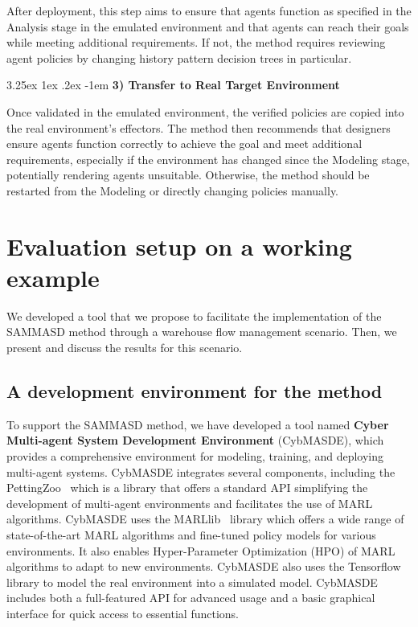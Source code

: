 \documentclass[conference]{IEEEtran}
\makeatletter
\renewcommand\paragraph{\@startsection{paragraph}{5}{\z@}%
  {3.25ex \@plus1ex \@minus.2ex}%
  {-1em}%
  {\normalfont\normalsize\bfseries}}
\makeatother
\begin{document}
After deployment, this step aims to ensure that agents function as specified in the Analysis stage in the emulated environment and that agents can reach their goals while meeting additional requirements. If not, the method requires reviewing agent policies by changing history pattern decision trees in particular.

\paragraph{\textbf{3) Transfer to Real Target Environment}}

Once validated in the emulated environment, the verified policies are copied into the real environment's effectors. The method then recommends that designers ensure agents function correctly to achieve the goal and meet additional requirements, especially if the environment has changed since the Modeling stage, potentially rendering agents unsuitable. Otherwise, the method should be restarted from the Modeling or directly changing policies manually.

\section{Evaluation setup on a working example}
\label{sec:evaluation}

We developed a tool that we propose to facilitate the implementation of the SAMMASD method through a warehouse flow management scenario. Then, we present and discuss the results for this scenario.

\subsection{A development environment for the method}

To support the SAMMASD method, we have developed a tool named \textbf{Cyber Multi-agent System Development Environment} (CybMASDE), which provides a comprehensive environment for modeling, training, and deploying multi-agent systems. CybMASDE integrates several components, including the PettingZoo~\cite{Terry2021} which is a library that offers a standard API simplifying the development of multi-agent environments and facilitates the use of MARL algorithms. CybMASDE uses the MARLlib~\cite{hu2022marllib} library which offers a wide range of state-of-the-art MARL algorithms and fine-tuned policy models for various environments. It also enables Hyper-Parameter Optimization (HPO) of MARL algorithms to adapt to new environments. CybMASDE also uses the Tensorflow library to model the real environment into a simulated model. CybMASDE includes both a full-featured API for advanced usage and a basic graphical interface for quick access to essential functions.
\end{document}
